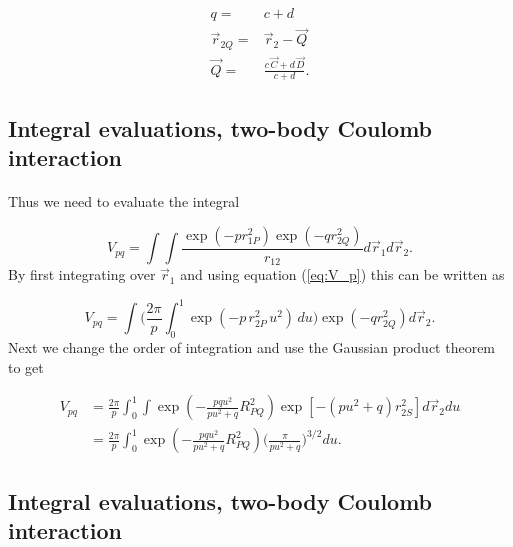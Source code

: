 \documentclass[%
twoside,                 %
final,                   %
10pt]{article}
\begin{document}
\begin{equation}
 \begin{split}
    q = & c + d\\
  \vec r_{2Q} = & \vec r_2 - \vec Q \\
  \vec Q = & \frac{c\,\vec C + d\,\vec D}{c + d}.
 \end{split}
\end{equation}



\subsection{Integral evaluations, two-body Coulomb interaction}

\paragraph{}

Thus we need to evaluate the integral

\begin{equation}
 V_{pq} = \int\int\frac{\exp(-pr^2_{1P})\exp(-qr^2_{2Q})}{r_{12}}d \vec r_1 d\vec r_2.
\end{equation}
By first integrating over $\vec r_1$ and using equation (\ref{eq:V_p}) this can be written as

\begin{equation}
 V_{pq} = \int\Big(\frac{2\pi}{p}\int_0^1\exp(-p\,r^2_{2P}\,u^2)\,du\Big)\exp(-qr^2_{2Q}) d \vec r_2.
\end{equation}
Next we change the order of integration and use the Gaussian product theorem to get

\begin{equation}
\begin{split}
 V_{pq} & = \frac{2\pi}{p}\int_0^1\int\exp(-\frac{pqu^2}{pu^2+q}R^2_{PQ})\exp[-(pu^2+q)r_{2S}^2] d\vec r_2 du \\
        & = \frac{2\pi}{p}\int_0^1\exp(-\frac{pqu^2}{pu^2+q}R^2_{PQ})\Big(\frac{\pi}{pu^2+q}\Big)^{3/2} du.
\end{split}
\end{equation}



\subsection{Integral evaluations, two-body Coulomb interaction}
\end{document}
